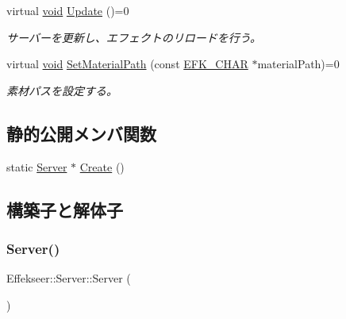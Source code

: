 \begin{DoxyCompactItemize}
virtual \mbox{\hyperlink{namespace_effekseer_ab34c4088e512200cf4c2716f168deb56}{void}} \mbox{\hyperlink{class_effekseer_1_1_server_af841f04fb41ed36b888cb2f89c4c0771}{Update}} ()=0
\begin{DoxyCompactList}\small\item\em サーバーを更新し、エフェクトのリロードを行う。 \end{DoxyCompactList}\item 
virtual \mbox{\hyperlink{namespace_effekseer_ab34c4088e512200cf4c2716f168deb56}{void}} \mbox{\hyperlink{class_effekseer_1_1_server_a4c0d31a5fd39184615179157a6929296}{Set\+Material\+Path}} (const \mbox{\hyperlink{_effekseer_8h_aca7eb5de6dd019c19ac58ea35a193f2f}{E\+F\+K\+\_\+\+C\+H\+AR}} $\ast$material\+Path)=0
\begin{DoxyCompactList}\small\item\em 素材パスを設定する。 \end{DoxyCompactList}\end{DoxyCompactItemize}
\subsection*{静的公開メンバ関数}
\begin{DoxyCompactItemize}
\item 
static \mbox{\hyperlink{class_effekseer_1_1_server}{Server}} $\ast$ \mbox{\hyperlink{class_effekseer_1_1_server_a010be3e29a3551b3f2bf058b593c3eb0}{Create}} ()
\end{DoxyCompactItemize}


\subsection{構築子と解体子}
\mbox{\label{class_effekseer_1_1_server_af6f7a1893fb9dfe2d65a9288698e3f5a}} 
\subsubsection{\texorpdfstring{Server()}{Server()}}
{\footnotesize\ttfamily Effekseer\+::\+Server\+::\+Server (\begin{DoxyParamCaption}{ }\end{DoxyParamCaption})\hspace{0.3cm}{\ttfamily [inline]}}

\mbox{\label{class_effekseer_1_1_server_a492364188996ee80d8baa9cba8e443d3}} 
